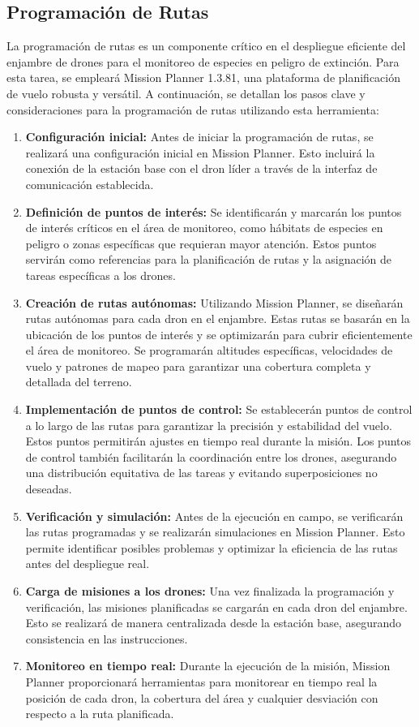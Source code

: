\subsection{Programación de Rutas}
La programación de rutas es un componente crítico en el despliegue eficiente del enjambre de drones para el monitoreo de especies en peligro de extinción. Para esta tarea, se empleará Mission Planner 1.3.81, una plataforma de planificación de vuelo robusta y versátil. A continuación, se detallan los pasos clave y consideraciones para la programación de rutas utilizando esta herramienta:
\begin{enumerate}
\item \textbf{Configuración inicial:} Antes de iniciar la programación de rutas, se realizará una configuración inicial en Mission Planner. Esto incluirá la conexión de la estación base con el dron líder a través de la interfaz de comunicación establecida.
\item \textbf{Definición de puntos de interés:} Se identificarán y marcarán los puntos de interés críticos en el área de monitoreo, como hábitats de especies en peligro o zonas específicas que requieran mayor atención.
Estos puntos servirán como referencias para la planificación de rutas y la asignación de tareas específicas a los drones.
\item \textbf{Creación de rutas autónomas:} Utilizando Mission Planner, se diseñarán rutas autónomas para cada dron en el enjambre. Estas rutas se basarán en la ubicación de los puntos de interés y se optimizarán para cubrir eficientemente el área de monitoreo.
Se programarán altitudes específicas, velocidades de vuelo y patrones de mapeo para garantizar una cobertura completa y detallada del terreno.
\item \textbf{Implementación de puntos de control:} Se establecerán puntos de control a lo largo de las rutas para garantizar la precisión y estabilidad del vuelo. Estos puntos permitirán ajustes en tiempo real durante la misión.
Los puntos de control también facilitarán la coordinación entre los drones, asegurando una distribución equitativa de las tareas y evitando superposiciones no deseadas.
\item \textbf{Verificación y simulación:} Antes de la ejecución en campo, se verificarán las rutas programadas y se realizarán simulaciones en Mission Planner. Esto permite identificar posibles problemas y optimizar la eficiencia de las rutas antes del despliegue real.
\item \textbf{Carga de misiones a los drones:} Una vez finalizada la programación y verificación, las misiones planificadas se cargarán en cada dron del enjambre. Esto se realizará de manera centralizada desde la estación base, asegurando consistencia en las instrucciones.
\item \textbf{Monitoreo en tiempo real:} Durante la ejecución de la misión, Mission Planner proporcionará herramientas para monitorear en tiempo real la posición de cada dron, la cobertura del área y cualquier desviación con respecto a la ruta planificada.
\end{enumerate}
